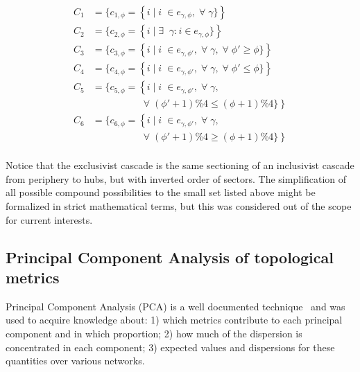 \documentclass[%
	aip,
	jmp,%
	amsmath,amssymb,
	reprint,%
]{revtex4-1}
\begin{document}
\begin{equation}
	\begin{split}
		C_1&=\{c_{1,\phi}=\left\{i\mid i\;\in e_{\gamma,\phi}, \;\forall\; \gamma\}\right\} \\
		C_2&=\{c_{2,\phi}=\left\{i\mid \exists \;\;\gamma: i \in e_{\gamma,\phi}\}\right\} \\
		C_3&=\{c_{3,\phi}=\left\{i\mid i\;\in e_{\gamma,\phi'}, \;\forall\; \gamma,\;\forall\;\phi'\geq \phi\}\right\} \\
		C_4&=\{c_{4,\phi}=\left\{i\mid i\;\in e_{\gamma,\phi'}, \;\forall\; \gamma,\;\forall\;\phi'\leq \phi\}\right\} \\
		C_5&=\{c_{5,\phi}=\left\{i\mid i\;\in e_{\gamma,\phi'}, \;\forall\; \gamma,\right.\\
																																	&\;\;\;\;\;\;\;\;\;\;\;\;\;\;\;\;\;\; \left.\;\forall\;(\phi'+1)\%4\leq (\phi+1)\%4\}\right\} \\
		C_6&=\{c_{6,\phi}=\left\{i\mid i\;\in e_{\gamma,\phi'}, \;\forall\; \gamma,\right.\\
																																	&\;\;\;\;\;\;\;\;\;\;\;\;\;\;\;\;\;\; \left.\;\forall\;(\phi'+1)\%4\geq (\phi+1)\%4\}\right\} \\
	\end{split}
\end{equation}

Notice that the exclusivist cascade is the same sectioning of an inclusivist cascade from periphery to hubs, but with inverted order of sectors. 
The simplification of all possible compound possibilities to the small set listed above might be formalized in strict mathematical terms, but this was considered out of the scope for current interests.




\subsection{Principal Component Analysis of topological metrics}\label{sec:pca}
Principal Component Analysis (PCA) is a well documented technique~\cite{pca} and was used to acquire knowledge about:
1) which metrics contribute to each principal component and in which proportion; 2) how much of the dispersion is concentrated in each component; 3) expected values and dispersions for these quantities over various networks.
\end{document}
